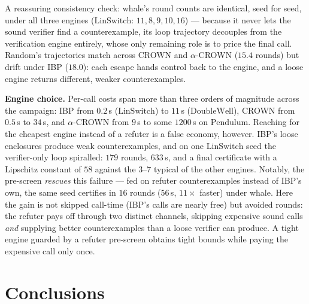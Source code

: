 A reassuring consistency check: whale's round counts are identical, seed for
seed, under all three engines ($\mathrm{LinSwitch}$: $11,8,9,10,16$) --- because it
never lets the sound verifier find a counterexample, its loop trajectory
decouples from the verification engine entirely, whose only remaining role is
to price the final call. Random's trajectories match across CROWN and
$\alpha$-CROWN ($15.4$ rounds) but drift under IBP ($18.0$): each escape hands
control back to the engine, and a loose engine returns different, weaker
counterexamples.

\textbf{Engine choice.} Per-call costs span more than three orders of magnitude across the
campaign: IBP from $0.2$\,s ($\mathrm{LinSwitch}$) to $11$\,s ($\mathrm{DoubleWell}$), CROWN from
$0.5$\,s to $34$\,s, and $\alpha$-CROWN from $9$\,s to some $1200$\,s on
$\mathrm{Pendulum}$. Reaching for the cheapest engine instead of a refuter is a false
economy, however. IBP's loose enclosures produce weak counterexamples, and on
one $\mathrm{LinSwitch}$ seed the verifier-only loop spiralled: $179$ rounds, $633$\,s,
and a final certificate with a Lipschitz constant of $58$ against the $3$--$7$
typical of the other engines. Notably, the pre-screen \emph{rescues} this
failure --- fed on refuter counterexamples instead of IBP's own, the same seed
certifies in $16$ rounds ($56$\,s, $11\times$ faster) under whale. Here the
gain is not skipped call-time (IBP's calls are nearly free) but avoided rounds:
the refuter pays off through two distinct channels, skipping expensive sound
calls \emph{and} supplying better counterexamples than a loose verifier can
produce. A tight engine guarded by a refuter pre-screen obtains tight bounds
while paying the expensive call only once.

\section{Conclusions}

